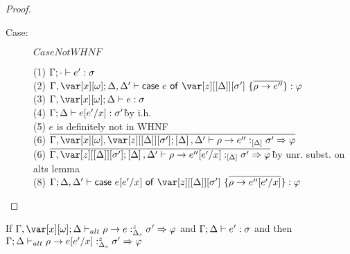 \begin{proof}
\begin{description}
\item[Case:] $CaseNotWHNF$
\begin{tabbing}
    (1) $\Gamma;\cdot \vdash e' : \sigma$\\
    (2) $\G,\xo;\D,\D' \vdash \ccase{e}{\z[\irr{\D}][\s']~\{\ov{\rho \to e''}\}} : \vp$\\
    (3) $\G,\xo;\D \vdash e :\s$\\
    (4) $\Gamma;\Delta \vdash e [e'/x] : \sigma'$\`by i.h.\\
    (5) $e$ is definitely not in WHNF\\
    (6) $\ov{\G,\xo,\z[\irr{\D}][\s'];\irr{\D},\D' \vdash \rho \to e'' :_{\irr{\D}} \s' \Rightarrow \vp}$\\
    (6) $\ov{\G,\z[\irr{\D}][\s'];\irr{\D},\D' \vdash \rho \to e''[e'/x] :_{\irr{\D}} \s' \Rightarrow \vp}$\`by unr. subst.  on alts lemma\\
    (8) $\G;\D,\D' \vdash \ccase{e[e'/x]}{\z[\irr{\D}][\s']~\{\ov{\rho \to e''[e'/x]}\}} : \vp$\\
\end{tabbing}

\end{description}

\end{proof}

\begin{sublemma}
If $\G, \xo; \D \vdash_{alt} \rho \to e :^z_{\Delta_s} \s' \Rightarrow \vp$ and $\Gamma; \Delta \vdash e' : \sigma$ and
    then $\Gamma; \Delta \vdash_{alt} \rho \to e[e'/x] :^z_{\Delta_s} \sigma' \Rightarrow \varphi$
\end{sublemma}


